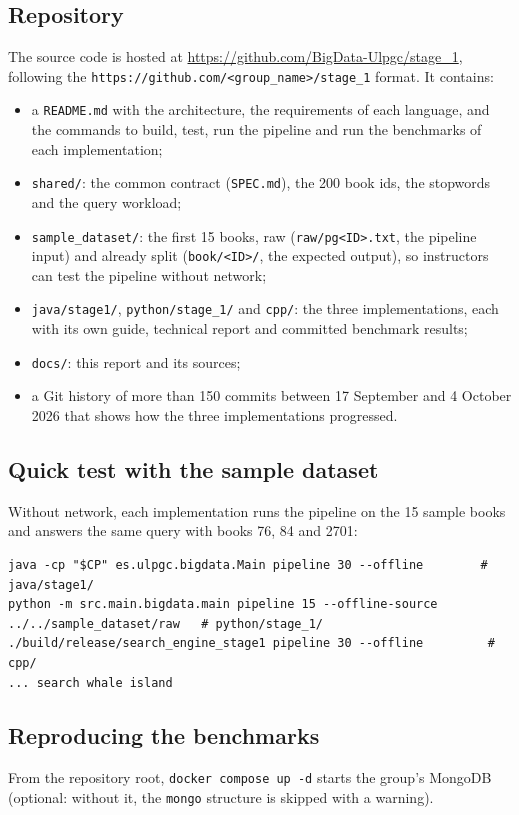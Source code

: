 \documentclass[11pt,a4paper]{article}
\newcommand{\code}[1]{\texttt{#1}}
\begin{document}
\subsection{Repository}
The source code is hosted at \url{https://github.com/BigData-Ulpgc/stage_1}, following the
\code{https://github.com/<group\_name>/stage\_1} format. It contains:
\begin{itemize}
  \item a \code{README.md} with the architecture, the requirements of each language, and the commands
        to build, test, run the pipeline and run the benchmarks of each implementation;
  \item \code{shared/}: the common contract (\code{SPEC.md}), the 200 book ids, the stopwords and the
        query workload;
  \item \code{sample\_dataset/}: the first 15 books, raw (\code{raw/pg<ID>.txt}, the pipeline input)
        and already split (\code{book/<ID>/}, the expected output), so instructors can test the
        pipeline without network;
  \item \code{java/stage1/}, \code{python/stage\_1/} and \code{cpp/}: the three implementations, each
        with its own guide, technical report and committed benchmark results;
  \item \code{docs/}: this report and its sources;
  \item a Git history of more than 150 commits between 17 September and 4 October 2026 that shows how
        the three implementations progressed.
\end{itemize}

\subsection{Quick test with the sample dataset}
Without network, each implementation runs the pipeline on the 15 sample books and answers the same
query with books 76, 84 and 2701:
\begin{lstlisting}
java -cp "$CP" es.ulpgc.bigdata.Main pipeline 30 --offline        # java/stage1/
python -m src.main.bigdata.main pipeline 15 --offline-source ../../sample_dataset/raw   # python/stage_1/
./build/release/search_engine_stage1 pipeline 30 --offline         # cpp/
... search whale island
\end{lstlisting}

\subsection{Reproducing the benchmarks}
From the repository root, \code{docker compose up -d} starts the group's MongoDB (optional: without
it, the \code{mongo} structure is skipped with a warning).
\end{document}
